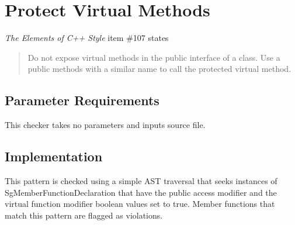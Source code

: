 %
%

\section{Protect Virtual Methods}
\label{ProtectVirtualMethods::overview}

{\it The Elements of C++ Style} item \#107 states
\begin{quote}
Do not expose virtual methods in the public interface of a class. Use a public methods with a similar name to call the protected virtual method.
\end{quote}

\subsection{Parameter Requirements}
This checker takes no parameters and inputs source file.

\subsection{Implementation}
This pattern is checked using a simple AST traversal that seeks instances of
SgMemberFunctionDeclaration that have the public access modifier and the
virtual function modifier boolean values set to true. Member functions that
match this pattern are flagged as violations.

